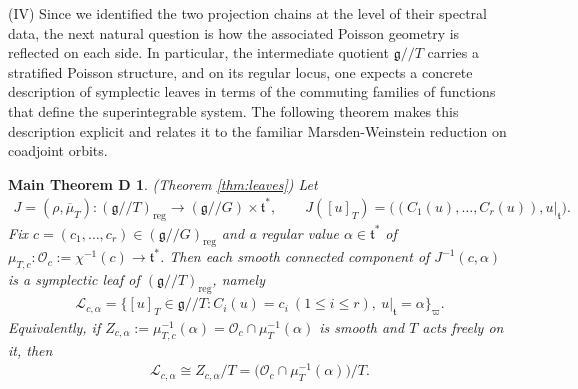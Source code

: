 \documentclass[11pt,reqno]{amsart}
\newtheorem*{theorem A}{Main Theorem A}
\newtheorem*{theorem B}{Main Theorem B}
\newtheorem*{theorem C}{Main Theorem C}
\newtheorem*{theorem D}{Main Theorem D}
\theoremstyle{definition}
\theoremstyle{plain}
\theoremstyle{conclusion}
\begin{document}
(IV) Since we identified the two projection chains at the level of their spectral data, the next natural question is how the associated Poisson geometry is reflected on each side. In particular, the intermediate quotient $\mathfrak{g}//T$ carries a stratified Poisson structure, and on its regular locus, one expects a concrete description of symplectic leaves in terms of the commuting families of functions that define the superintegrable system. The following theorem makes this description explicit and relates it to the familiar Marsden-Weinstein reduction on coadjoint orbits.
 

\begin{theorem D}
(Theorem \ref{thm:leaves})
   Let \begin{align*}
    J = (\rho,\overline{\mu}_T):(\mathfrak{g}//T)_{\mathrm{reg}}\to(\mathfrak{g}//G)\times\mathfrak{t}^*, \qquad J([u]_T)=\bigl((C_1(u),\ldots,C_r(u)),u|_{\mathfrak{t}}\bigr).
\end{align*} Fix $c=(c_1,\ldots,c_r)\in(\mathfrak{g}//G)_{\mathrm{reg}}$ and a regular value $\alpha\in\mathfrak{t}^*$ of $\mu_{T,c}:\mathcal{O}_c:=\chi^{-1}(c)\to\mathfrak{t}^*$. Then each smooth connected component of $J^{-1}(c,\alpha)$ is a symplectic leaf of $(\mathfrak{g}//T)_{\mathrm{reg}}$, namely \begin{align*}
    \mathcal{L}_{c,\alpha} =\bigl\{[u]_T\in\mathfrak{g}//T:
C_i(u)=c_i\ (1\leq i\leq r),\ u|_{\mathfrak{t}}=\alpha\bigr\}_{\varpi}.
\end{align*} Equivalently, if $Z_{c,\alpha}:=\mu_{T,c}^{-1}(\alpha)=\mathcal{O}_c\cap\mu_T^{-1}(\alpha)$ is smooth and $T$ acts freely on it, then \begin{align*}
    \mathcal{L}_{c,\alpha}\cong Z_{c,\alpha}/T =\bigl(\mathcal{O}_c\cap\mu_T^{-1}(\alpha)\bigr)/T.
\end{align*} 
\end{theorem D} 
 
\end{document}

